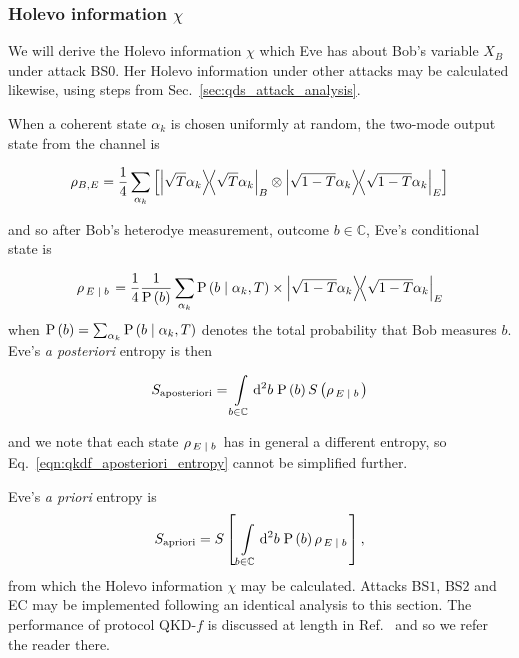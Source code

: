 \subsubsection{Holevo information $\chi$}
We will derive the Holevo information $\chi$ which Eve has about Bob's variable $X_B$ under attack BS$0$. Her Holevo information under other attacks may be calculated likewise, using steps from Sec.~\ref{sec:qds_attack_analysis}.

When a coherent state $\alpha_k$ is chosen uniformly at random, the two-mode output state from the channel is

\begin{equation}
\rho_{B, E} = \frac{1}{4} \sum_{\alpha_k} \left[ \dyad{\sqrt{T}\alpha_k}_B \otimes \dyad{\sqrt{1-T}\alpha_k}_E\right]
\end{equation}

\noindent and so after Bob's heterodye measurement, outcome $b \in \mathbb{C}$, Eve's conditional state is

\begin{equation}\label{eqn:qkdf_eve_conditional}
\rho_{\left. E \given b\right.} = \frac{1}{4} \frac{1}{\text{P}\left(b\right)} \sum_{\alpha_k} \text{P}\left(b \given \alpha_k, T\right) \times \dyad{\sqrt{1-T}\alpha_k}_E
\end{equation}
when $\text{P}\left(b\right) = \sum_{\alpha_k}\text{P}\left(b \; \middle| \; \alpha_k, T\right)$ denotes the total probability that Bob measures $b$. Eve's \emph{a posteriori} entropy is then

\begin{equation}\label{eqn:qkdf_aposteriori_entropy}
S_{\text{aposteriori}} = \int\limits_{b \in \mathbb{C}} \mathop{}\!\mathrm{d^2} b \; \text{P}\left(b\right) S\left(\rho_{\left. E \; \middle| \; b \right.}\right)
\end{equation}

\noindent and we note that each state $\rho_{\left.E\; \middle| \; b \right.}$ has in general a different entropy, so Eq.~\ref{eqn:qkdf_aposteriori_entropy} cannot be simplified further. 

Eve's \emph{a priori} entropy is
\begin{equation}\label{eqn:qkdf_apriori_entropy}
S_{\text{apriori}} = S\left[\, \int\limits_{b \in \mathbb{C}} \mathop{}\!\mathrm{d^2} b \; \text{P}\left(b\right) \rho_{\left. E \; \middle| \; b \right.}\right],
\end{equation}
from which the Holevo information $\chi$ may be calculated. Attacks BS$1$, BS$2$ and EC may be implemented following an identical analysis to this section. The performance of protocol QKD-$f$ is discussed at length in Ref.~\cite{Papanstasiou2018} and so we refer the reader there. 



